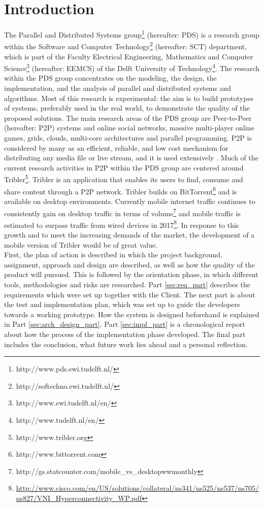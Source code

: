 \part{Introduction}
The Parallel and Distributed Systems group\footnote{http://www.pds.ewi.tudelft.nl/} (hereafter: PDS) is a research group within the Software and Computer Technology\footnote{http://softechno.ewi.tudelft.nl/} (hereafter: SCT) department, which is part of the Faculty Electrical Engineering, Mathematics and Computer Science\footnote{http://www.ewi.tudelft.nl/en/} (hereafter: EEMCS) of the Delft University of Technology\footnote{http://www.tudelft.nl/en/}. The research within the PDS group concentrates on the modeling, the design, the implementation, and the analysis of parallel and distributed systems and algorithms. Most of this research is experimental: the aim is to build prototypes of systems, preferably used in the real world, to demonstrate the quality of the proposed solutions. The main research areas of the PDS group are Peer-to-Peer (hereafter: P2P) systems and online social networks, massive multi-player online games, grids, clouds, multi-core architectures and parallel programming. 
P2P is considered by many as an efficient, reliable, and low cost mechanism for distributing any media file or live stream, and it is used extensively \cite{internet_study}. Much of the current research activities in P2P within the PDS group are centered around Tribler\footnote{http://www.tribler.org}. Tribler is an application that enables its users to find, consume and share content through a P2P network. Tribler builds on BitTorrent\footnote{http://www.bittorrent.com} and is available on desktop environments. Currently mobile internet traffic continues to consistently gain on desktop traffic in terms of volume\footnote{http://gs.statcounter.com/mobile\_vs\_desktop\-ww\-monthly} and mobile traffic is estimated to surpass traffic from wired devices in 2017\footnote{\url{http://www.cisco.com/en/US/solutions/collateral/ns341/ns525/ns537/ns705/ns827/VNI\_Hyperconnectivity\_WP.pdf}}. In response to this growth and to meet the increasing demands of the market, the development of a mobile version of Tribler would be of great value. \\

First, the plan of action is described in which the project background, assignment, approach and design are described, as well as how the quality of the product will pursued. This is followed by the orientation phase, in which different tools, methodologies and risks are researched. Part \ref{sec:req_part} describes the requirements which were set up together with the Client. The next part is about the test and implementation plan, which was set up to guide the developers towards a working prototype. How the system is designed beforehand is explained in Part \ref{sec:arch_design_part}. Part \ref{sec:impl_part} is a chronological report about how the process of the implementation phase developed. The final part includes the conclusion, what future work lies ahead and a personal reflection.
